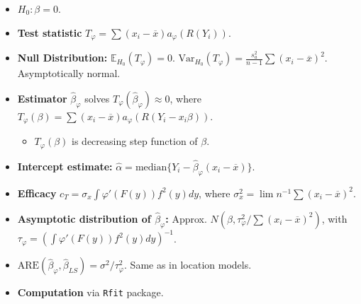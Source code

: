 \begin{itemize}
	\item $H_0: \beta=0$.
	\item \textbf{Test statistic} $T_\varphi = \sum (x_i-\overline{x})a_\varphi(R(Y_i))$.
	\item \textbf{Null Distribution:} $\mathbb{E}_{H_0}(T_\varphi)=0$. $\text{Var}_{H_0}(T_\varphi) = \frac{s_a^2}{n-1}\sum(x_i-\overline{x})^2$. Asymptotically normal.
	\item \textbf{Estimator} $\widehat{\beta}_\varphi$ solves $T_\varphi(\widehat{\beta}_\varphi) \approx 0$, where $T_\varphi(\beta) = \sum (x_i-\overline{x})a_\varphi(R(Y_i-x_i\beta))$.
	\begin{itemize}
		\item $T_\varphi(\beta)$ is decreasing step function of $\beta$.
	\end{itemize}
	\item \textbf{Intercept estimate:} $\widehat{\alpha} = \text{median}\{Y_i - \widehat{\beta}_\varphi(x_i-\overline{x})\}$.
	\item \textbf{Efficacy} $c_T = \sigma_x \int \varphi'(F(y))f^2(y)dy$, where $\sigma_x^2 = \lim n^{-1}\sum(x_i-\overline{x})^2$.
	\item \textbf{Asymptotic distribution of $\widehat{\beta}_\varphi$:} Approx. $N(\beta, \tau_\varphi^2/\sum(x_i-\overline{x})^2)$, with $\tau_\varphi = (\int \varphi'(F(y))f^2(y)dy)^{-1}$.
	\item $\text{ARE}(\widehat{\beta}_\varphi, \widehat{\beta}_{LS}) = \sigma^2/\tau_\varphi^2$. Same as in location models.
	\item \textbf{Computation} via \lstinline{Rfit} package.
\end{itemize}
